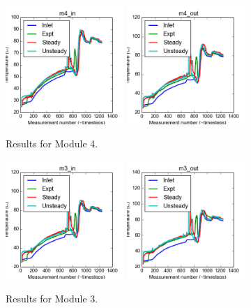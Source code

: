 \documentclass{article}
\begin{document}
\clearpage
\begin{figure}[!ht]
\centering
\includegraphics[width=0.4\textwidth]{../../data/ICSolar/images/Jan31_m4_in_compare.png}\hspace{0.05\textwidth}
\includegraphics[width=0.4\textwidth]{../../data/ICSolar/images/Jan31_m4_out_compare.png}\hspace{0.05\textwidth}\\
\caption{Results for Module 4.}\end{figure}
\begin{figure}[!ht]
\centering
\includegraphics[width=0.4\textwidth]{../../data/ICSolar/images/Jan31_m3_in_compare.png}\hspace{0.05\textwidth}
\includegraphics[width=0.4\textwidth]{../../data/ICSolar/images/Jan31_m3_out_compare.png}\hspace{0.05\textwidth}\\
\caption{Results for Module 3.}\end{figure}
\end{document}
